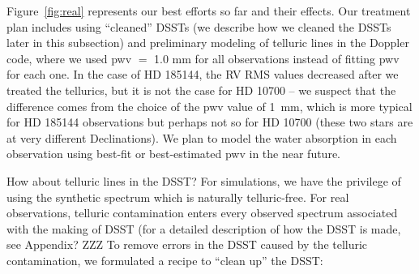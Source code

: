 Figure~\ref{fig:real} represents our best efforts so far and
their effects. Our treatment plan includes using ``cleaned'' DSSTs (we
describe how we cleaned the DSSTs later in this subsection) and
preliminary modeling of telluric lines in the Doppler code, where we
used pwv $=$ 1.0 mm for all observations instead of fitting pwv for
each one. In the case of HD 185144, the RV RMS values decreased after
we treated the tellurics, but it is not the case for HD 10700 -- we
suspect that the difference comes from the choice of the pwv value of
1~mm, which is more typical for HD 185144 observations but perhaps not
so for HD 10700 (these two stars are at very different
Declinations). We plan to model the water absorption in each
observation using best-fit or best-estimated pwv in the near future.

How about telluric lines in the DSST? For simulations, we have the
privilege of using the synthetic spectrum which is naturally
telluric-free. For real observations, telluric contamination enters
every observed spectrum associated with the making of DSST (for a
detailed description of how the DSST is made, see
Appendix? ZZZ To remove errors in the DSST
caused by the telluric contamination, we formulated a recipe to
``clean up'' the DSST:

